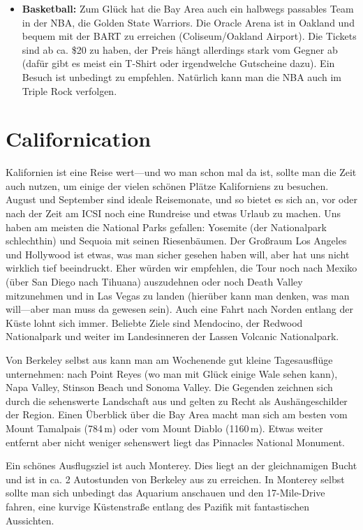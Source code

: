 \documentclass[a4paper]{scrreprt}
\begin{document}
\begin{itemize}
	\item \textbf{Basketball:} Zum Glück hat die Bay Area auch ein halbwegs passables Team in der NBA, die Golden State Warriors. Die Oracle Arena ist in Oakland und bequem mit der BART zu erreichen (Coliseum/Oakland Airport). Die Tickets sind ab ca. \$20 zu haben, der Preis hängt allerdings stark vom Gegner ab (dafür gibt es meist ein T-Shirt oder irgendwelche Gutscheine dazu). Ein Besuch ist unbedingt zu empfehlen. Natürlich kann man die NBA auch im Triple Rock verfolgen.

\end{itemize}

\section{Californication}

Kalifornien ist eine Reise wert---und wo man schon mal da ist, sollte man die Zeit auch nutzen, 
um einige der vielen schönen Plätze Kaliforniens zu besuchen. 
August und September sind ideale Reisemonate, und so bietet es sich an, 
vor oder nach der Zeit am ICSI noch eine Rundreise und etwas Urlaub zu machen. 
Uns haben am meisten die National Parks gefallen: Yosemite (der Nationalpark schlechthin) und Sequoia mit seinen Riesenbäumen. Der Großraum Los Angeles und Hollywood ist etwas, was man sicher gesehen haben will, aber hat uns nicht wirklich tief beeindruckt. Eher würden wir empfehlen, die Tour noch nach Mexiko (über San Diego nach Tihuana) auszudehnen oder noch Death Valley mitzunehmen und in Las Vegas zu landen (hierüber kann man denken, was man will---aber man muss da gewesen sein). Auch eine Fahrt nach Norden entlang der Küste lohnt sich immer. Beliebte Ziele sind Mendocino, der Redwood Nationalpark und weiter im Landesinneren der Lassen Volcanic Nationalpark.

Von Berkeley selbst aus kann man am Wochenende gut kleine Tagesausflüge unternehmen: nach Point Reyes (wo man mit Glück einige Wale sehen kann), Napa Valley, Stinson Beach und Sonoma Valley. Die Gegenden zeichnen sich durch die sehenswerte Landschaft aus und gelten zu Recht als Aushängeschilder der Region. Einen Überblick über die Bay Area macht man sich am besten vom Mount Tamalpais (784\,m) oder vom Mount Diablo (1160\,m).
Etwas weiter entfernt aber nicht weniger sehenswert liegt das Pinnacles National Monument. 

Ein schönes Ausflugsziel ist auch Monterey. Dies liegt an der gleichnamigen Bucht und ist in ca. 2 Autostunden von Berkeley aus zu erreichen. In Monterey selbst sollte man sich unbedingt das Aquarium anschauen und den 17-Mile-Drive fahren, eine kurvige Küstenstraße entlang des Pazifik mit fantastischen Aussichten.
\end{document}

